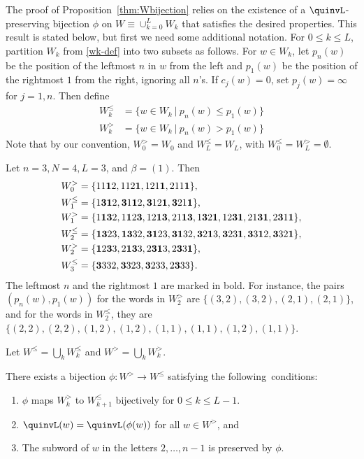 The proof of Proposition~\ref{thm:Wbijection} relies on the existence of a $\quinvL$-preserving bijection $\phi$ on $W \equiv \cup_{k=0}^L W_k$ that satisfies the desired properties. This result is stated below, but first we need some additional notation. For $0 \leq k \leq L$, partition $W_k$ from \eqref{wk-def} into two subsets as follows. For $w \in W_k$, let $p_n(w)$ be the position of the leftmost $n$ in $w$ from the left and $p_1(w)$ be the position of the rightmost $1$ from the right, ignoring all $n$'s. If $c_j(w)=0$, set $p_j(w)=\infty$ for $j=1,n$. Then define
\begin{align*}
W_k^{\leq}& = \{w\in W_k\ |\ p_n(w) \leq p_1(w)\} \\
W_k^>&= \{w\in W_k\ |\ p_n(w) > p_1(w)\}
\end{align*}
Note that by our convention, $W_0^>=W_0$ and $W_L^\leq=W_L$, with $W_0^\leq=W_L^>=\emptyset$.  
\begin{example}\label{Wkleq-eg}
Let $n=3, N=4, L=3$, and $\beta=(1)$. Then
\begin{align*}
W_0^>&=\{11{\bf1}2,112{\bf1},121{\bf1},211{\bf1}\},\\
W_1^\leq&=\{1{\bf31}2,{\bf3}1{\bf1}2,{\bf3}12{\bf1}, {\bf3}21{\bf1}\},\\
W_1^>&=\{1{\bf13}2, 1{\bf1}2{\bf3},12{\bf13},21{\bf13}, 1{\bf3}2{\bf1},12{\bf31},21{\bf31},2{\bf3}1{\bf1} \}, \\
W_2^\leq &= \{{\bf1 3} 2 3 ,  {\bf1 3} 3 2 ,  {\bf3 1} 2 3,  {\bf3 1} 3 2 ,  {\bf3} 2 {\bf1} 3 ,  {\bf3} 2 3 {\bf1} ,  {\bf3} 3 {\bf1} 2 ,  {\bf3} 3 2 {\bf1} \}, \\
W_2^> &= \{{\bf1}2{\bf3}3, 2{\bf13}3, 2{\bf31}3, 2{\bf3}3{\bf1}\},\\
W_3^\leq &= \{{\bf3}332,{\bf3}323,{\bf3}233,2{\bf3}33\}.
\end{align*}
The leftmost $n$ and the rightmost $1$ are marked in bold. For instance, the pairs $(p_n(w),p_1(w))$ for the words in $W_2^>$ are $\{(3,2), (3,2), (2,1), (2,1)\}$, and for the words in $W_2^\leq$, they are $\{(2,2), (2,2),(1,2),(1,2),(1,1),(1,1),(1,2),(1,1)\}$.
\end{example}

Let $W^\leq = \bigcup_k W_k^\leq$ and $W^> = \bigcup_k W_k^>$. 

\begin{theorem}\label{thm:invol}
There exists a bijection $\phi : W^> \to W^\leq$ satisfying the
following~conditions:
\begin{enumerate}[label=(\arabic*)]
\item \label{it1vvt1} $\phi$ maps $W_k^>$ to $W_{k+1}^\leq$ bijectively for $0 \leq k \leq L-1$.
\item \label{it1vvt2} $\quinvL(w) = \quinvL(\phi(w))$ for all $w \in W^>$, and
\item \label{it1vvt3} The subword of $w$ in the letters $2, \dots, n-1$ is preserved by 
$\phi$.
\end{enumerate}
\end{theorem}




